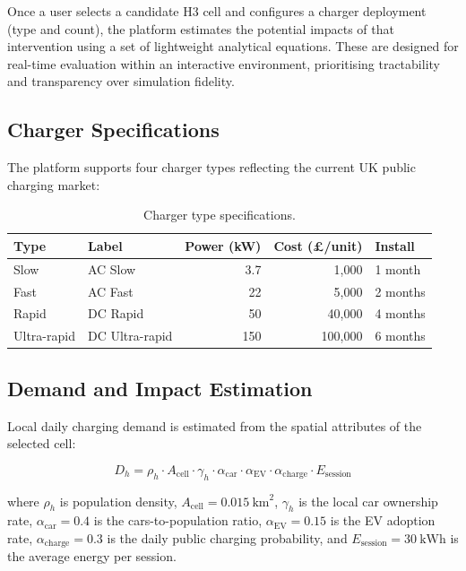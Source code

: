 Once a user selects a candidate H3 cell and configures a charger deployment (type and count), the platform estimates the potential impacts of that intervention using a set of lightweight analytical equations. These are designed for real-time evaluation within an interactive environment, prioritising tractability and transparency over simulation fidelity.

\subsection{Charger Specifications}
\label{sec:charger-specs}

The platform supports four charger types reflecting the current UK public charging market:

\begin{table}[htbp]
\centering
\caption{Charger type specifications.}
\label{tab:charger-specs}
\small
\begin{tabular}{llrrl}
\toprule
\textbf{Type} & \textbf{Label} & \textbf{Power (kW)} & \textbf{Cost (\pounds/unit)} & \textbf{Install} \\
\midrule
Slow & AC Slow & 3.7 & 1{,}000 & 1 month \\
Fast & AC Fast & 22 & 5{,}000 & 2 months \\
Rapid & DC Rapid & 50 & 40{,}000 & 4 months \\
Ultra-rapid & DC Ultra-rapid & 150 & 100{,}000 & 6 months \\
\bottomrule
\end{tabular}
\end{table}

\subsection{Demand and Impact Estimation}
\label{sec:demand}

Local daily charging demand is estimated from the spatial attributes of the selected cell:

\begin{equation}
\label{eq:demand}
D_h = \rho_h \cdot A_{\text{cell}} \cdot \gamma_h \cdot \alpha_{\text{car}} \cdot \alpha_{\text{EV}} \cdot \alpha_{\text{charge}} \cdot E_{\text{session}}
\end{equation}

\noindent where $\rho_h$ is population density, $A_{\text{cell}} = 0.015~\text{km}^2$, $\gamma_h$ is the local car ownership rate, $\alpha_{\text{car}} = 0.4$ is the cars-to-population ratio, $\alpha_{\text{EV}} = 0.15$ is the EV adoption rate, $\alpha_{\text{charge}} = 0.3$ is the daily public charging probability, and $E_{\text{session}} = 30~\text{kWh}$ is the average energy per session.

